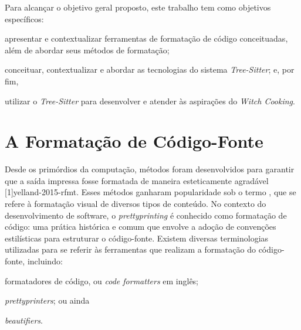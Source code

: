 \documentclass
  [11pt, a4paper, english, openright, sumario = tradicional, twoside, brazil]
  {abntex2}
\begin{document}
  Para alcançar o objetivo geral proposto, este trabalho tem como objetivos
  específicos:
  \begin{inparaenum}
    \item apresentar e contextualizar ferramentas de formatação de código
          conceituadas, além de abordar seus métodos de formatação;
    \item conceituar, contextualizar e abordar as tecnologias do sistema
          \textit{Tree-Sitter}; e, por fim,
    \item utilizar o \textit{Tree-Sitter} para desenvolver e atender às
          aspirações do \textit{Witch Cooking}.
  \end{inparaenum}


  \chapter{A Formatação de Código-Fonte}

  Desde os primórdios da computação, métodos foram desenvolvidos para garantir
  que a saída impressa fosse formatada de maneira esteticamente agradável
  [1]{yelland-2015-rfmt}. Esses métodos ganharam
  popularidade sob o termo \textit{}, que se refere à
  formatação visual de diversos tipos de conteúdo. No contexto do
  desenvolvimento de software, o \textit{prettyprinting} é conhecido como
  formatação de código: uma prática histórica e comum que envolve a adoção de
  convenções estilísticas para estruturar o código-fonte. Existem diversas
  terminologias utilizadas para se referir às ferramentas que realizam a
  formatação do código-fonte, incluindo:
  \begin{inparaenum}
    \item formatadores de código, ou \textit{code formatters} em inglês;
    \item \textit{prettyprinters}; ou ainda
    \item \textit{beautifiers}.
  \end{inparaenum}
\end{document}

